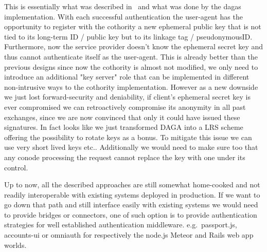     This is essentially what was described in~\cite[Sect.4.5.1]{syta_identity_2015} and what was done by the dagas
    implementation.
    With each successful authentication the user-agent has the opportunity to register with the cothority a new ephemeral public key
    that is not tied to its long-term ID / public key but to its linkage tag / pseudonymousID\@.
    Furthermore, now the service provider doesn't know the ephemeral secret key and thus cannot authenticate itself as the user-agent.
    \newline
    This is already better than the previous designs since now the cothority is almost not modified, we only need to introduce an additional
    "key server" role that can be implemented in different non-intrusive ways to the cothority implementation.
    \newline
    However as a new downside we just lost forward-security and deniability, if client's ephemeral secret key is ever compromised we can retroactively
    compromise its anonymity in all past exchanges, since we are now convinced that only it could have issued these signatures.
    In fact looks like we just transformed DAGA into a LRS scheme offering the possibility to rotate keys as a bonus.
    To mitigate this issue we can use very short lived keys etc..
    Additionally we would need to make sure too that any conode processing the request cannot replace the key
    with one under its control.\medskip


    Up to now, all the described approaches are still somewhat home-cooked and not readily interoperable with existing systems
    deployed in production.
    If we want to go down that path and still interface easily with existing systems we would need to provide bridges or
    connectors, one of such option is to provide authentication strategies for well established authentication middleware.
    e.g.\ passport.js, accounts-ui or omniauth for respectively the node.js Meteor and Rails web app worlds.\medskip

